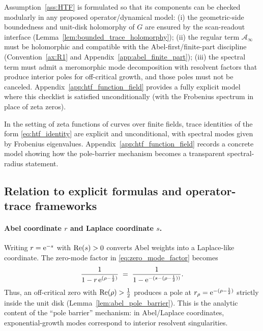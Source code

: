 \begin{remark}
\label{rem:htf_checklist}
Assumption~\ref{ass:HTF} is formulated so that its components can be checked modularly in any proposed operator/dynamical model:
(i) the geometric-side boundedness and unit-disk holomorphy of $G$ are ensured by the scan-readout interface (Lemma~\ref{lem:bounded_trace_holomorphy});
(ii) the regular term $\mathcal{A}_\infty$ must be holomorphic and compatible with the Abel-first/finite-part discipline (Convention~\ref{ax:R1} and Appendix~\ref{app:abel_finite_part});
(iii) the spectral term must admit a meromorphic mode decomposition with resolvent factors that produce interior poles for off-critical growth, and those poles must not be canceled.
Appendix~\ref{app:htf_function_field} provides a fully explicit model where this checklist is satisfied unconditionally (with the Frobenius spectrum in place of zeta zeros).
\end{remark}

\begin{remark}
\label{rem:htf_function_field}
In the setting of zeta functions of curves over finite fields, trace identities of the form \eqref{eq:htf_identity} are explicit and unconditional, with spectral modes given by Frobenius eigenvalues.
Appendix~\ref{app:htf_function_field} records a concrete model showing how the pole-barrier mechanism becomes a transparent spectral-radius statement.
\end{remark}

\subsection{Relation to explicit formulas and operator-trace frameworks}
\label{sec:htf_relation}

\paragraph{Abel coordinate \texorpdfstring{$r$}{r} and Laplace coordinate \texorpdfstring{$s$}{s}.}
Writing $r=\mathrm{e}^{-s}$ with $\operatorname{Re}(s)>0$ converts Abel weights into a Laplace-like coordinate.
The zero-mode factor in \eqref{eq:zero_mode_factor} becomes
\[
\frac{1}{1-r\,\mathrm{e}^{(\rho-\frac12)}}
\;=\;
\frac{1}{1-\mathrm{e}^{-(s-(\rho-\frac12))}}.
\]
Thus, an off-critical zero with $\operatorname{Re}(\rho)>\tfrac12$ produces a pole at $r_\rho=\mathrm{e}^{-(\rho-\frac12)}$ strictly inside the unit disk (Lemma~\ref{lem:abel_pole_barrier}).
This is the analytic content of the ``pole barrier'' mechanism: in Abel/Laplace coordinates, exponential-growth modes correspond to interior resolvent singularities.

